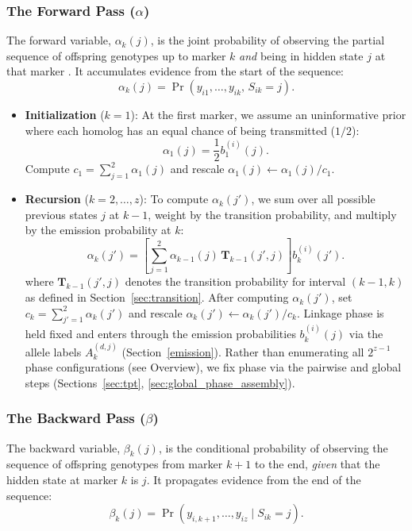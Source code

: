 \documentclass[11pt]{article}
\begin{document}
\subsubsection{The Forward Pass (\texorpdfstring{$\alpha$}{alpha})}
The forward variable, $\alpha_k(j)$, is the joint probability of observing the partial sequence of offspring genotypes up to marker $k$ \textit{and} being in hidden state $j$ at that marker \citep{Rabiner1989}. It accumulates evidence from the start of the sequence:
\begin{equation}
    \alpha_k(j) = \Pr(y_{i1},\ldots,y_{ik},\, S_{ik}=j).
\end{equation}

\begin{itemize}
    \item \textbf{Initialization} ($k=1$): At the first marker, we assume an uninformative prior where each homolog has an equal chance of being transmitted ($1/2$):
\begin{equation}
    \alpha_1(j) = \frac{1}{2} b_1^{(i)}(j).
\end{equation}
Compute $c_1=\sum_{j=1}^2 \alpha_1(j)$ and rescale $\alpha_1(j)\leftarrow \alpha_1(j)/c_1$.
\item \textbf{Recursion} ($k=2, \dots, z$): To compute $\alpha_k(j')$, we sum over all possible previous states $j$ at $k-1$, weight by the transition probability, and multiply by the emission probability at $k$:
\begin{equation}
    \alpha_k(j') = \left[ \sum_{j=1}^{2} \alpha_{k-1}(j) \, \mathbf{T}_{k-1}(j',j) \right] b_k^{(i)}(j').
\end{equation}
\noindent where \(\mathbf{T}_{k-1}(j',j)\) denotes the transition probability for interval
\((k{-}1,k)\) as defined in Section~\ref{sec:transition}. After computing $\alpha_k(j')$, set $c_k=\sum_{j'=1}^2 \alpha_k(j')$ and rescale
$\alpha_k(j')\leftarrow \alpha_k(j')/c_k$.
Linkage phase is held fixed and enters through the emission probabilities \(b_k^{(i)}(j)\) via
the allele labels \(A_k^{(d,j)}\) (Section~\ref{emission}).
Rather than enumerating all \(2^{z-1}\) phase configurations (see Overview), we fix phase via the pairwise and global steps (Sections~\ref{sec:tpt}, \ref{sec:global_phase_assembly}). 
\end{itemize}

\subsubsection{The Backward Pass (\texorpdfstring{$\beta$}{beta})}
The backward variable, $\beta_k(j)$, is the conditional probability of observing the sequence of offspring genotypes from marker $k+1$ to the end, \textit{given} that the hidden state at marker $k$ is $j$. It propagates evidence from the end of the sequence:
\begin{equation}
    \beta_k(j) = \Pr(y_{i,k+1},\ldots,y_{iz} \mid S_{ik}=j).
\end{equation}
\end{document}
